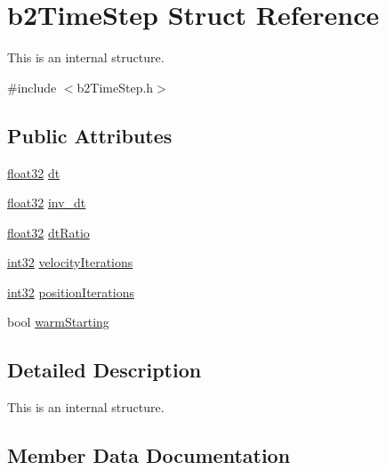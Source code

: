 \hypertarget{structb2_time_step}{}\section{b2\+Time\+Step Struct Reference}
\label{structb2_time_step}


This is an internal structure.  




{\ttfamily \#include $<$b2\+Time\+Step.\+h$>$}

\subsection*{Public Attributes}
\begin{DoxyCompactItemize}
\item 
\mbox{\hyperlink{b2_settings_8h_aacdc525d6f7bddb3ae95d5c311bd06a1}{float32}} \mbox{\hyperlink{structb2_time_step_a74e20836809accba98a4445fbcb3427c}{dt}}
\item 
\mbox{\hyperlink{b2_settings_8h_aacdc525d6f7bddb3ae95d5c311bd06a1}{float32}} \mbox{\hyperlink{structb2_time_step_ac2d652bde6d303149db9d0a461bc22ba}{inv\+\_\+dt}}
\item 
\mbox{\hyperlink{b2_settings_8h_aacdc525d6f7bddb3ae95d5c311bd06a1}{float32}} \mbox{\hyperlink{structb2_time_step_aa67bc8a12ffafce918d9e6a0d8d3f203}{dt\+Ratio}}
\item 
\mbox{\hyperlink{b2_settings_8h_a43d43196463bde49cb067f5c20ab8481}{int32}} \mbox{\hyperlink{structb2_time_step_a9f2a0ccd8029681f254003b66f201ce1}{velocity\+Iterations}}
\item 
\mbox{\hyperlink{b2_settings_8h_a43d43196463bde49cb067f5c20ab8481}{int32}} \mbox{\hyperlink{structb2_time_step_ab7938eec17a1a3d7961d8364e150f1be}{position\+Iterations}}
\item 
bool \mbox{\hyperlink{structb2_time_step_add80f7f86c84f005ad817f0313df3f32}{warm\+Starting}}
\end{DoxyCompactItemize}


\subsection{Detailed Description}
This is an internal structure. 

\subsection{Member Data Documentation}
\mbox{\label{structb2_time_step_a74e20836809accba98a4445fbcb3427c}} 
